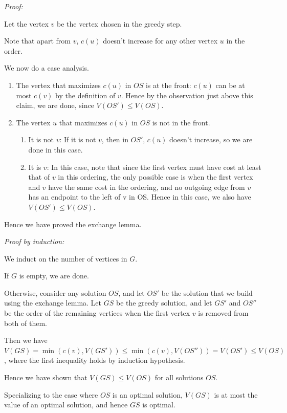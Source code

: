 \documentclass[answers]{exam}
\begin{document}
\begin{questions}
\begin{solution}
    \textit{Proof:}

    Let the vertex $v$ be the vertex chosen in the greedy step.

    Note that apart from $v$, $c(u)$ doesn't increase for any other vertex $u$ in the order.

    We now do a case analysis.

    \begin{enumerate}
    \item The vertex that maximizes $c(u)$ in $OS$ is at the front: $c(u)$ can be at most $c(v)$ by the definition of $v$. Hence by the observation just above this claim, we are done, since $V(OS')
    \le V(OS)$.
    \item The vertex $u$ that maximizes $c(u)$ in $OS$ is not in the front.
        \begin{enumerate}
        \item It is not $v$:
            If it is not $v$, then in $OS'$, $c(u)$ doesn't increase, so we are done in this case.
        \item It is $v$:
            In this case, note that since the first vertex must have cost at least that of $v$ in this ordering, the only possible case is when the first vertex and $v$ have the same cost in the
            ordering, and no outgoing edge from $v$ has an endpoint to the left of v in OS. Hence in this case, we also have $V(OS') \le V(OS)$.
        \end{enumerate}
    \end{enumerate}

Hence we have proved the exchange lemma.

    \textit{Proof by induction:}

    We induct on the number of vertices in $G$.

    If $G$ is empty, we are done.

    Otherwise, consider any solution $OS$, and let $OS'$ be the solution that we build using the exchange lemma. Let $GS$ be the greedy solution, and let $GS'$ and $OS''$ be the order of the remaining
    vertices when the first vertex $v$ is removed from both of them.

    Then we have $V(GS) = \min(c(v), V(GS')) \le \min(c(v), V(OS'')) = V(OS') \le V(OS)$, where the first inequality holds by induction hypothesis.

    Hence we have shown that $V(GS) \le V(OS)$ for all solutions $OS$.

    Specializing to the case where $OS$ is an optimal solution, $V(GS)$ is at most the value of an optimal solution, and hence $GS$ is optimal.



\end{solution}
\end{questions}
\end{document}
